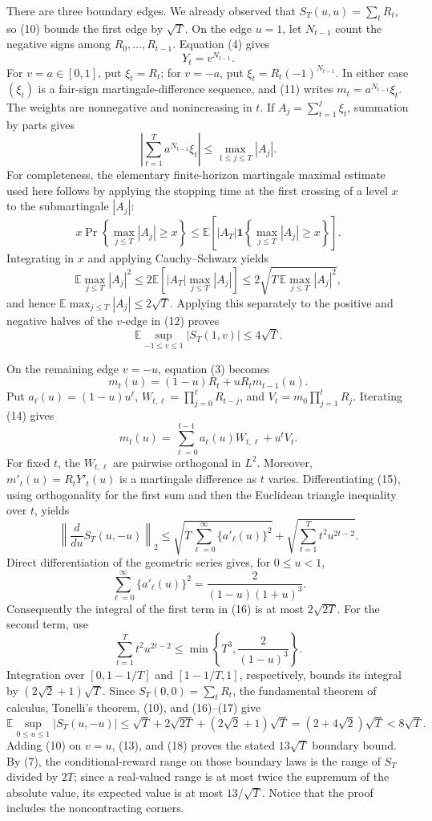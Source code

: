 There are three boundary edges.  We already observed that \(S_T(u,u)=\sum_tR_t\), so (10) bounds the first edge by \(\sqrt T\).  On the edge \(u=1\), let \(N_{t-1}\) count the negative signs among \(R_0,\ldots,R_{t-1}\).  Equation (4) gives
\[
 Y_t=v^{N_{t-1}}.
 \tag{11}
\]
For \(v=a\in[0,1]\), put \(\xi_t=R_t\); for \(v=-a\), put \(\xi_t=R_t(-1)^{N_{t-1}}\).  In either case \((\xi_t)\) is a fair-sign martingale-difference sequence, and (11) writes \(m_t=a^{N_{t-1}}\xi_t\).  The weights are nonnegative and nonincreasing in \(t\).  If \(A_j=\sum_{t=1}^j\xi_t\), summation by parts gives
\[
 \left|\sum_{t=1}^T a^{N_{t-1}}\xi_t\right|
 \leq\max_{1\leq j\leq T}|A_j|.
 \tag{12}
\]
For completeness, the elementary finite-horizon martingale maximal estimate used here follows by applying the stopping time at the first crossing of a level \(x\) to the submartingale \(|A_j|\):
\[
 x\Pr\left\{\max_{j\leq T}|A_j|\geq x\right\}
 \leq \mathbb E\left[|A_T|\mathbf 1\left\{\max_{j\leq T}|A_j|\geq x\right\}\right].
\]
Integrating in \(x\) and applying Cauchy--Schwarz yields
\[
 \mathbb E\max_{j\leq T}|A_j|^2
 \leq2\mathbb E\left[|A_T|\max_{j\leq T}|A_j|\right]
 \leq2\sqrt{T\,\mathbb E\max_{j\leq T}|A_j|^2},
\]
and hence \(\mathbb E\max_{j\leq T}|A_j|\leq2\sqrt T\).  Applying this separately to the positive and negative halves of the \(v\)-edge in (12) proves
\[
 \mathbb E\sup_{-1\leq v\leq1}|S_T(1,v)|\leq4\sqrt T.
 \tag{13}
\]

On the remaining edge \(v=-u\), equation (3) becomes
\[
 m_t(u)=(1-u)R_t+uR_tm_{t-1}(u).
 \tag{14}
\]
Put \(a_\ell(u)=(1-u)u^\ell\), \(W_{t,\ell}=\prod_{j=0}^{\ell}R_{t-j}\), and \(V_t=m_0\prod_{j=1}^tR_j\).  Iterating (14) gives
\[
 m_t(u)=\sum_{\ell=0}^{t-1}a_\ell(u)W_{t,\ell}+u^tV_t.
 \tag{15}
\]
For fixed \(t\), the \(W_{t,\ell}\) are pairwise orthogonal in \(L^2\).  Moreover, \(m'_t(u)=R_tY'_t(u)\) is a martingale difference as \(t\) varies.  Differentiating (15), using orthogonality for the first sum and then the Euclidean triangle inequality over \(t\), yields
\[
 \left\|\frac{d}{du}S_T(u,-u)\right\|_2
 \leq
 \sqrt{T\sum_{\ell=0}^{\infty}\{a'_\ell(u)\}^2}
 +\sqrt{\sum_{t=1}^Tt^2u^{2t-2}}.
 \tag{16}
\]
Direct differentiation of the geometric series gives, for \(0\leq u<1\),
\[
 \sum_{\ell=0}^{\infty}\{a'_\ell(u)\}^2
 =\frac{2}{(1-u)(1+u)^3}.
 \tag{17}
\]
Consequently the integral of the first term in (16) is at most \(2\sqrt{2T}\).  For the second term, use
\[
 \sum_{t=1}^Tt^2u^{2t-2}
 \leq\min\left\{T^3,\frac{2}{(1-u)^3}\right\}.
\]
Integration over \([0,1-1/T]\) and \([1-1/T,1]\), respectively, bounds its integral by \((2\sqrt2+1)\sqrt T\).  Since \(S_T(0,0)=\sum_tR_t\), the fundamental theorem of calculus, Tonelli's theorem, (10), and (16)--(17) give
\[
 \mathbb E\sup_{0\leq u\leq1}|S_T(u,-u)|
 \leq\sqrt T+2\sqrt{2T}+(2\sqrt2+1)\sqrt T
 =(2+4\sqrt2)\sqrt T<8\sqrt T.
 \tag{18}
\]
Adding (10) on \(v=u\), (13), and (18) proves the stated \(13\sqrt T\) boundary bound.  By (7), the conditional-reward range on those boundary laws is the range of \(S_T\) divided by \(2T\); since a real-valued range is at most twice the supremum of the absolute value, its expected value is at most \(13/\sqrt T\).  Notice that the proof includes the noncontracting corners.

